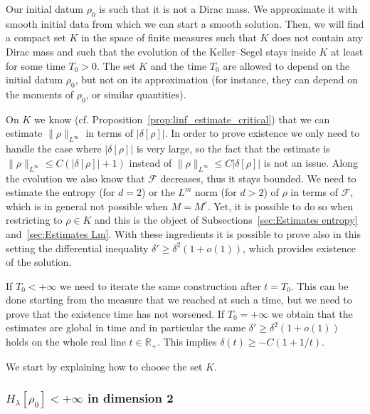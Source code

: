 \documentclass[11pt,a4paper]{article}
\numberwithin{equation}{section}
\newcommand{\R}{{\mathbb{R}}}
\theoremstyle{plain}
\theoremstyle{remark}
\newcommand{\step}[1][]{%
  \if\relax\detokenize{#1}\relax
    \def\thisstep{.}%
  \else
    \def\thisstep{: \protect #1.}%
  \fi
  \item}
\begin{document}
\begin{enumeratesteps}
    \step Our initial datum $\rho_0$ is such that it is not a Dirac mass. We approximate it with smooth initial data from which we can start a smooth solution. Then, we will find a compact set $K$ in the space of finite measures such that $K$ does not contain any Dirac mass and such that the evolution of the Keller--Segel stays inside $K$ at least for some time $T_0>0$. The set $K$ and the time $T_0$ are allowed to depend on the initial datum $\rho_0$, but not on its approximation (for instance, they can depend on the moments of $\rho_0$, or similar quantities). 
    \step On $K$ we know (cf. Proposition~\ref{prop:linf_estimate_critical}) that we can estimate $\|\rho\|_{L^\infty}$ in terms of $|\delta[\rho]|$. In order to prove existence we only need to handle the case where $|\delta[\rho]|$ is very large, so the fact that the estimate is $\|\rho\|_{L^\infty}\leq C(|\delta[\rho]|+1)$ instead of $\|\rho\|_{L^\infty}\leq C|\delta[\rho]|$ is not an issue. Along the evolution we also know that $\mathcal F$ decreases, thus it stays bounded. We need to estimate the entropy (for $d=2$) or the $L^m$ norm (for $d>2$) of $\rho$ in terms of $\mathcal F$, which is in general not possible when $M=M^c$. Yet, it is possible to do so when restricting to $\rho\in K$ and this is the object of Subsections~\ref{sec:Estimates entropy} and~\ref{sec:Estimates Lm}. With these ingredients it is possible to prove also in this setting the differential inequality $\delta'\geq \delta^2(1+o(1))$, which provides existence of the solution.
    \step If $T_0<+\infty$ we need to iterate the same construction after $t=T_0$. This can be done starting from the measure that we reached at such a time, but we need to prove that the existence time has not worsened. If $T_0=+\infty$ we obtain that the estimates are global in time and in particular the same $\delta'\geq \delta^2(1+o(1))$ holds on the whole real line $t\in\R_+$. This implies $\delta(t)\geq -C(1+1/t)$.
\end{enumeratesteps}

We start by explaining how to choose the set $K$.

\subsubsection{\texorpdfstring{$H_\lambda[\rho_{0}]<+\infty$}{Hlambda[rho0]<+infty} in dimension 2}
\end{document}
